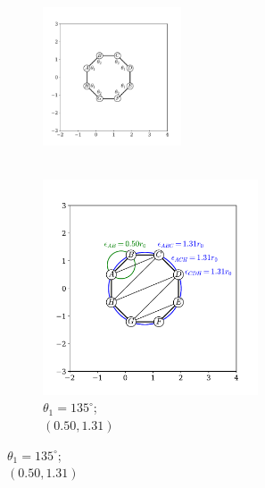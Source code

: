 \begin{figure}[tb]
	\centering
     
      \begin{subfigure}[b]{0.45\textwidth}
         \centering
         \includegraphics[width=0.45\textwidth]{./figures/ph/sl_oct_b3_135x.pdf}
         \caption{\phantom{xxx} \\ \phantom{xxx}}
         \label{fig:sloct}
     \end{subfigure}
     \hfill
     \begin{subfigure}[b]{0.45\textwidth}
         \centering
         \includegraphics[width=0.7\textwidth]{./figures/ph/sl_oct_b3_135.pdf}
         \caption{$\theta_1=135^\circ$; \\$\left(0.50,1.31\right)$}
         \label{fig:sloct}
     \end{subfigure}
     

\end{figure}
